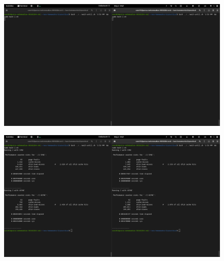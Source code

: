 \documentclass{article}
\begin{document}
\subsection{}
\begin{figure}[H]
   \centering
   \includegraphics[width=\linewidth]{2-2-command.png}
\end{figure}
\begin{figure}[H]
   \centering
   \includegraphics[width=\linewidth]{2-2-result.png}
\end{figure}
\end{document}
